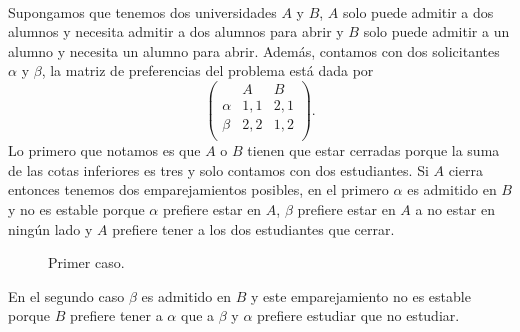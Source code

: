\begin{eje}
\cite{Todo}\\
Supongamos que tenemos dos universidades $A$ y $B$, $A$ solo puede admitir a dos alumnos y necesita admitir a dos alumnos para abrir y $B$ solo puede admitir a un alumno y necesita un alumno para abrir. Además, contamos con dos solicitantes $\alpha$ y $\beta$, la matriz de preferencias del problema está dada por 
$$\begin{pmatrix}
& A & B \\
\alpha & 1,1 & 2,1 \\
\beta & 2,2 & 1,2 \\ 
\end{pmatrix}.$$
Lo primero que notamos es que $A$ o $B$ tienen que estar cerradas porque la suma de las cotas inferiores es tres y solo contamos con dos estudiantes. Si $A$ cierra entonces tenemos dos emparejamientos posibles, en el primero $\alpha$ es admitido en $B$ y no es estable porque $\alpha$ prefiere estar en $A$, $\beta$ prefiere estar en $A$ a no estar en ningún lado y $A$ prefiere tener a los dos estudiantes que cerrar. 
\begin{figure}[H]\centering


\caption{Primer caso.}
\end{figure}
En el segundo caso $\beta$ es admitido en $B$ y este emparejamiento no es estable porque $B$ prefiere tener a $\alpha$ que a $\beta$ y $\alpha$ prefiere estudiar que no estudiar. 
\begin{figure}[H]\centering


\end{figure}
\end{eje}
